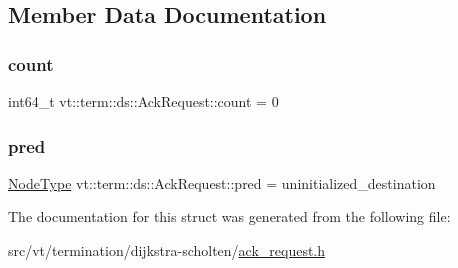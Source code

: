 \subsection{Member Data Documentation}
\mbox{\label{structvt_1_1term_1_1ds_1_1_ack_request_adc7efe7df809adf8b7cefeb121509e5e}} 
\subsubsection{\texorpdfstring{count}{count}}
{\footnotesize\ttfamily int64\+\_\+t vt\+::term\+::ds\+::\+Ack\+Request\+::count = 0}

\mbox{\label{structvt_1_1term_1_1ds_1_1_ack_request_afb3bc50a132952ca60f0652c0396a6ac}} 
\subsubsection{\texorpdfstring{pred}{pred}}
{\footnotesize\ttfamily \hyperlink{namespacevt_a866da9d0efc19c0a1ce79e9e492f47e2}{Node\+Type} vt\+::term\+::ds\+::\+Ack\+Request\+::pred = uninitialized\+\_\+destination}



The documentation for this struct was generated from the following file\+:\begin{DoxyCompactItemize}
\item 
src/vt/termination/dijkstra-\/scholten/\hyperlink{ack__request_8h}{ack\+\_\+request.\+h}\end{DoxyCompactItemize}
